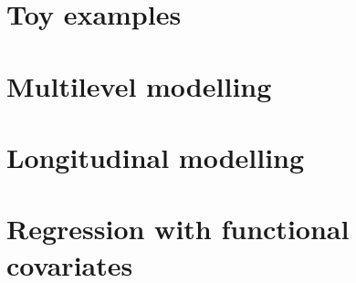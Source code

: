 \documentclass[a4paper,showframe,11pt]{report}
\begin{document}

\section{Toy examples}


\section{Multilevel modelling}


\section{Longitudinal modelling}


\section{Regression with functional covariates}


\hClosingStuffStandalone
\end{document}
